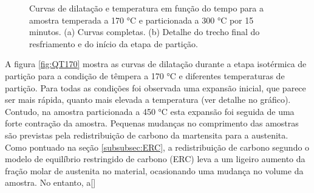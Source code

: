 \begin{figure}
	\vspace{0pt}
	\caption{Curvas de dilatação e temperatura em função do tempo para a amostra temperada a 170 °C e particionada a 300 °C por 15 minutos. (a) Curvas completas. (b) Detalhe do trecho final do resfriamento e do início da etapa de partição.}
	\label{fig:TP170-300}
\end{figure}

A figura \ref{fig:QT170} mostra as curvas de dilatação durante a etapa isotérmica de partição para a condição de têmpera a 170 °C e diferentes temperaturas de partição. Para todas as condições foi observada uma expansão inicial, que parece ser mais rápida, quanto mais elevada a temperatura (ver detalhe no gráfico). Contudo, na amostra particionada a 450 °C esta expansão foi seguida de uma forte contração da amostra. Pequenas mudanças no comprimento das amostras são previstas pela redistribuição de carbono da martensita para a austenita. Como pontuado na seção \ref{subsubsec:ERC}, a redistribuição de carbono segundo o modelo de equilíbrio restringido de carbono (ERC) leva a um ligeiro aumento da fração molar de austenita no material, ocasionando uma mudança no volume da amostra. No entanto, a[] 

